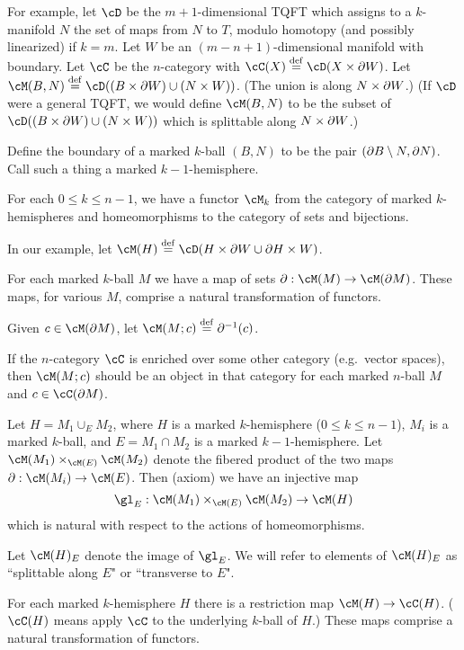 For example, let $\cD$ be the $m{+}1$-dimensional TQFT which assigns to a $k$-manifold $N$ the set 
of maps from $N$ to $T$, modulo homotopy (and possibly linearized) if $k=m$.
Let $W$ be an $(m{-}n{+}1)$-dimensional manifold with boundary.
Let $\cC$ be the $n$-category with $\cC(X) \deq \cD(X\times \bd W)$.
Let $\cM(B, N) \deq \cD((B\times \bd W)\cup (N\times W))$.
(The union is along $N\times \partial W$.)
(If $\cD$ were a general TQFT, we would define $\cM(B, N)$ to be
the subset of $\cD((B\times \bd W)\cup (N\times W))$ which is splittable along $N\times \partial W$.)

Define the boundary of a marked $k$-ball $(B, N)$ to be the pair $(\partial B \setminus N, \partial N)$.
Call such a thing a {marked $k{-}1$-hemisphere}.

{For each $0 \le k \le n-1$, we have a functor $\cM_k$ from 
the category of marked $k$-hemispheres and 
homeomorphisms to the category of sets and bijections.}

In our example, let $\cM(H) \deq \cD(H\times\bd W \cup \bd H\times W)$.

{For each marked $k$-ball $M$ we have a map of sets $\bd: \cM(M)\to \cM(\bd M)$.
These maps, for various $M$, comprise a natural transformation of functors.}

Given $c\in\cM(\bd M)$, let $\cM(M; c) \deq \bd^{-1}(c)$.

If the $n$-category $\cC$ is enriched over some other category (e.g.\ vector spaces),
then $\cM(M; c)$ should be an object in that category for each marked $n$-ball $M$
and $c\in \cC(\bd M)$.

{Let $H = M_1 \cup_E M_2$, where $H$ is a marked $k$-hemisphere ($0\le k\le n-1$),
$M_i$ is a marked $k$-ball, and $E = M_1\cap M_2$ is a marked $k{-}1$-hemisphere.
Let $\cM(M_1) \times_{\cM(E)} \cM(M_2)$ denote the fibered product of the 
two maps $\bd: \cM(M_i)\to \cM(E)$.
Then (axiom) we have an injective map
\[
	\gl_E : \cM(M_1) \times_{\cM(E)} \cM(M_2) \to \cM(H)
\]
which is natural with respect to the actions of homeomorphisms.}

Let $\cM(H)_E$ denote the image of $\gl_E$.
We will refer to elements of $\cM(H)_E$ as ``splittable along $E$" or ``transverse to $E$". 


{For each marked $k$-hemisphere $H$ there is a restriction map
$\cM(H)\to \cC(H)$.  
($\cC(H)$ means apply $\cC$ to the underlying $k$-ball of $H$.)
These maps comprise a natural transformation of functors.}

